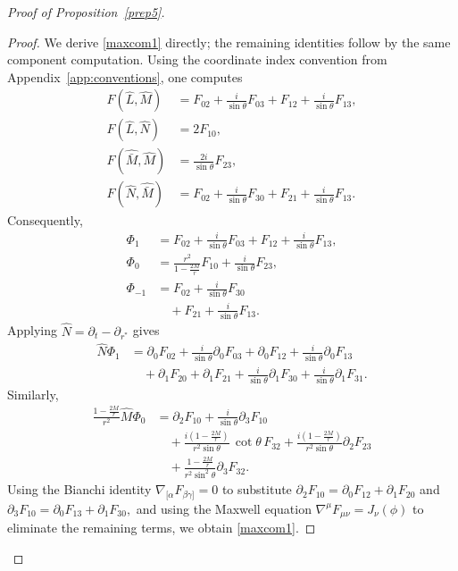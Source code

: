 \documentclass[11pt]{article}
\numberwithin{equation}{section}
\theoremstyle{plain}
\theoremstyle{definition}
\theoremstyle{remark}
\begin{document}
\begin{proof}[Proof of Proposition~\ref{prep5}]
\begin{proof}
We derive \eqref{maxcom1} directly; the remaining identities follow by the same component computation.
Using the coordinate index convention from Appendix~\ref{app:conventions}, one computes
\begin{eqnarray}
F(\hat L,\hat M)
&=
F_{02}+\frac{i}{\sin\theta}F_{03}+F_{12}+\frac{i}{\sin\theta}F_{13},
\\
F(\hat L,\hat N)
&=
2F_{10},
\\
F(\hat{\bar M},\hat M)
&=
\frac{2i}{\sin\theta}F_{23},
\\
F(\hat N,\hat{\bar M})
&=
F_{02}+\frac{i}{\sin\theta}F_{30}+F_{21}+\frac{i}{\sin\theta}F_{13}.
\end{eqnarray}
Consequently,
\begin{eqnarray}
\Phi_{1}
&=F_{02}+\frac{i}{\sin\theta}F_{03}+F_{12}+\frac{i}{\sin\theta}F_{13},\\
\Phi_{0}
&=\frac{r^{2}}{1-\frac{2M}{r}}F_{10}+\frac{i}{\sin\theta}F_{23},\\
\Phi_{-1}
&=F_{02}+\frac{i}{\sin\theta}F_{30}\\
&\quad+F_{21}+\frac{i}{\sin\theta}F_{13}.
\end{eqnarray}
Applying $\hat N=\partial_t-\partial_{r^{\ast}}$ gives
\begin{eqnarray}\label{com1}
\hat N\Phi_{1}
&=
\partial_{0}F_{02}+\frac{i}{\sin\theta}\partial_{0}F_{03}
+\partial_{0}F_{12}+\frac{i}{\sin\theta}\partial_{0}F_{13}\nonumber\\
&\quad
+\partial_{1}F_{20}+\partial_{1}F_{21}
+\frac{i}{\sin\theta}\partial_{1}F_{30}+\frac{i}{\sin\theta}\partial_{1}F_{31}.
\end{eqnarray}
Similarly,
\begin{eqnarray}\label{com2}
\frac{1-\frac{2M}{r}}{r^{2}}\hat M\Phi_{0}
&=
\partial_{2}F_{10}+\frac{i}{\sin\theta}\partial_{3}F_{10}\nonumber\\
&\quad
+\frac{i(1-\frac{2M}{r})}{r^{2}\sin\theta}\,\cot\theta\,F_{32}
+\frac{i(1-\frac{2M}{r})}{r^{2}\sin\theta}\partial_{2}F_{23}\nonumber\\
&\quad
+\frac{1-\frac{2M}{r}}{r^{2}\sin^{2}\theta}\partial_{3}F_{32}.
\end{eqnarray}
Using the Bianchi identity $\nabla_{[\alpha}F_{\beta\gamma]}=0$ to substitute
\(
\partial_{2}F_{10}=\partial_{0}F_{12}+\partial_{1}F_{20}
\)
and
\(
\partial_{3}F_{10}=\partial_{0}F_{13}+\partial_{1}F_{30},
\)
and using the Maxwell equation $\nabla^\mu F_{\mu\nu}=J_\nu(\phi)$ to eliminate the remaining terms, we obtain \eqref{maxcom1}.
\end{proof}


\end{proof}
\end{document}
